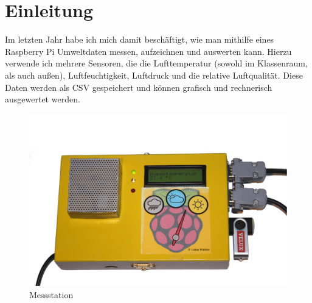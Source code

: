 \chapter{Einleitung}
Im letzten Jahr habe ich mich damit beschäftigt, wie man mithilfe eines Raspberry Pi Umweltdaten messen, aufzeichnen und auswerten kann. Hierzu verwende ich mehrere Sensoren, die die Lufttemperatur (sowohl im Klassenraum, als auch außen), Luftfeuchtigkeit, Luftdruck und die relative Luftqualität. Diese Daten werden als \gls{CSV} gespeichert und können grafisch und rechnerisch ausgewertet werden.
\begin{figure}[h]
  \centering
     \includegraphics[width=\textwidth]{figures/gesamt.png}
  \caption{Messstation}
  \label{fig:gesamt}
\end{figure}
